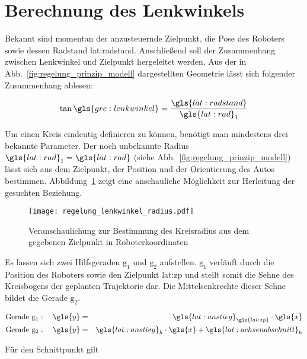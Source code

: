 \section{Berechnung des Lenkwinkels \dcfirstauthorshort}

Bekannt sind momentan der anzusteuernde Zielpunkt, die Pose des Roboters sowie dessen Radstand \gls{lat:radstand}. Anschließend soll der Zusammenhang zwischen Lenkwinkel und Zielpunkt hergeleitet werden. 
Aus der in Abb.~\ref{fig:regelung_prinzip_modell} dargestellten Geometrie lässt sich folgender Zusammenhang ablesen:

\begin{equation}
\tan \gls{gre:lenkwinkel} = \frac{\gls{lat:radstand}}{{\gls{lat:rad}}_1}
\label{eq:regelung_lenkwinkel_lenkwinkeltan}
\end{equation}

Um einen Kreis eindeutig definieren zu können, benötigt man mindestens drei bekannte Parameter. Der noch unbekannte Radius \({\gls{lat:rad}}_1 = \gls{lat:rad}\) (siehe Abb.~\ref{fig:regelung_prinzip_modell}) lässt sich aus dem Zielpunkt, der Position und der Orientierung des Autos bestimmen. Abbildung~\ref{fig:regelung_lenkwinkel_radius} zeigt eine anschauliche Möglichkeit zur Herleitung der gesuchten Beziehung. 

\begin{figure}[H] %
  \centering
  \texttt{[image: regelung\_lenkwinkel\_radius.pdf]}
  \caption{Veranschaulichung zur Bestimmung des Kreisradius aus dem gegebenen Zielpunkt in Roboterkoordinaten}
  \label{fig:regelung_lenkwinkel_radius}
\end{figure}

Es lassen sich zwei Hilfsgeraden \( \mathrm{g_1} \) und \( \mathrm{g_2} \) aufstellen. \( \mathrm{g_1}\) verläuft durch die Position des Roboters  sowie den Zielpunkt \gls{lat:zp} und stellt somit die Sehne des Kreisbogens der geplanten Trajektorie dar. Die Mittelsenkrechte dieser Sehne bildet die Gerade \( \mathrm{g_2} \).

\begin{eqnarray}
\text{Gerade } \mathrm{g_1}: \quad \gls{y} & = & {\gls{lat:anstieg}}_{\gls{lat:zp}} \cdot \gls{x} 	\\
\text{Gerade } \mathrm{g_2}: \quad \gls{y} & = & {\gls{lat:anstieg}}_h \cdot \gls{x} + {\gls{lat:achsenabschnitt}}_h  \label{eq:regelung_lenkwinkel_geradengleichung2}
\end{eqnarray}

Für den Schnittpunkt  gilt


